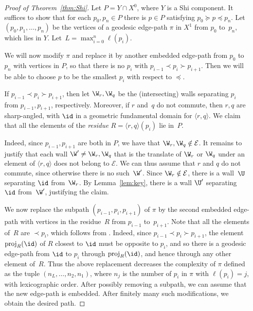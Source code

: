 \begin{proof}[Proof of Theorem~\ref{thm:Shi}] Let $P=Y\cap X^0$, where $Y$ is a Shi component.
	It suffices to show that for each $p_0,p_n\in P$ there is $p\in P$ satisfying $p_0\succeq p\preceq p_n$. Let $(p_0,p_1,\ldots,p_n)$ be the
	vertices of a geodesic edge-path $\pi$ in $X^1$ from $p_0$ to~$p_n$, which lies in $Y$. Let~$L=\max_{i=0}^n\ell(p_i)$.
	
	We will now modify $\pi$ and replace it by another embedded edge-path from $p_0$ to~$p_n$ with vertices in $P$, so that there is no
	$p_i$ with $p_{i-1}\prec p_i\succ p_{i+1}$. Then we will be able to choose $p$ to be the smallest $p_i$ with respect to $\preceq$.
	
	If $p_{i-1}\prec p_i\succ p_{i+1}$, then let $\W_r,\W_q$ be the (intersecting) walls separating $p_i$ from $p_{i-1},p_{i+1}$, respectively. Moreover, if $r$ and~$q$ do not commute, then $r,q$ are sharp-angled, with $\id$
	in a geometric fundamental domain for $\langle r,q\rangle$. We claim that all the elements of the \emph{residue} $R=\langle r,q\rangle (p_i)$ lie in~$P$.
	
	Indeed, since $p_{i-1},p_{i+1}$ are both in $P$, we have that $\W_r,\W_q\notin \mathcal E$. 
	It remains to justify that each wall $\W'\neq \W_r,\W_q$ that is the translate
	of $\W_r$ or $\W_q$ under an element of $\langle r,q\rangle$ does not belong to $\mathcal E$. We can thus assume that $r$ and $q$ do not commute, since otherwise there is no
	such~$\W'$. Since $\W_r\notin \mathcal E$, there is a wall~$\U$ separating $\id$ from~$\W_r$. By Lemma~\ref{lem:key}, there is a wall $\U'$ separating $\id$
	from~$\W'$, justifying the claim.
	
	We now replace the subpath $(p_{i-1},p_i,p_{i+1})$ of $\pi$ by the second embedded edge-path with vertices in the residue~$R$ from $p_{i-1}$ to~$p_{i+1}$. Note that all the elements of~$R$ are $\prec p_i$, which follows from \cite[Thm.~2.9]{Ronan_2009}. Indeed, since $p_{i-1}\prec p_i\succ p_{i+1}$, the element $\mathrm{proj}_R(\id)$ of $R$ closest to $\id$ must be opposite to $p_i$, and so there is a geodesic edge-path from $\id$ to $p_i$ through $\mathrm{proj}_R(\id)$, and hence through any other element of~$R$. Thus the above replacement decreases the complexity
	of $\pi$ defined as the tuple $(n_L,\ldots,n_2,n_1)$, where $n_j$ is the number of $p_i$ in $\pi$ with $\ell(p_i)=j$, with lexicographic
	order. After possibly removing a subpath, we can assume that the new edge-path is embedded. After finitely many such modifications, we obtain the desired path.
\end{proof}

